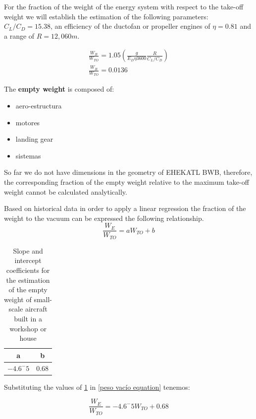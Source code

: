 For the fraction of the weight of the energy system with respect to the take-off weight we will establish the estimation of the following parameters: $C_L / C_D = 15.38$, an efficiency of the ductofan or propeller engines of  $\eta  = 0.81$ and a range of  $R= 12,060 m$.

\begin{gather}
    \frac{W_B}{W_{TO}} = 1.05 (\frac{g}{E_D \eta 3600} \frac{R}{C_L/C_D}) \\
    \frac{W_B}{W_{TO}} = 0.0136
\end{gather}

\medskip

The \textbf{empty weight} is composed of:
\begin{itemize}
    \item aero-estructura
    \item motores
    \item landing gear
    \item sistemas
\end{itemize}

So far we do not have dimensions in the geometry of EHEKATL BWB, therefore, the corresponding fraction of the empty weight relative to the maximum take-off weight cannot be calculated analytically. 

Based on historical data in order to apply a linear regression the fraction of the weight to the vacuum can be expressed the following relationship. 
\begin{equation}
\label{peso vacío equation}
    \frac{W_E}{W_{TO}}= a W_{TO} + b
\end{equation}


\begin{table}[!h]
    \centering
    \begin{tabular}{|c|c|}
    \hline
    a & b \\
    \hline
     $-4.6^-5$& $0.68$  \\
    \hline
    \end{tabular}
    \caption{Slope and intercept coefficients for the estimation of the empty weight of small-scale aircraft built in a workshop or house \cite{Sadraey2013}}
    \label{coeficientes del peso al vacío}
\end{table}

Substituting the values of \ref{coeficientes del peso al vacío} in \ref{peso vacío equation} tenemos: 

\begin{equation}
\label{peso vacío equation}
    \frac{W_E}{W_{TO}}= -4.6^-5 W_{TO} + 0.68
\end{equation}

